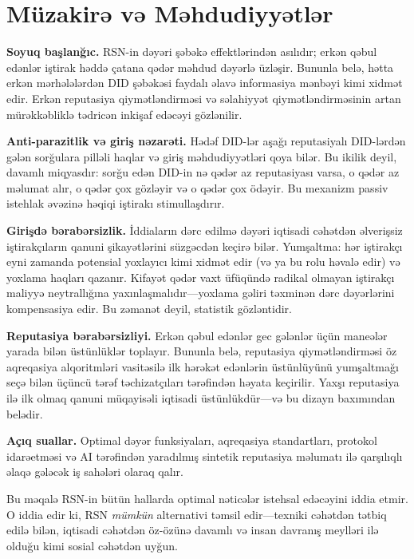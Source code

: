 \documentclass[11pt,a4paper,twocolumn]{article}
\begin{document}
\section{Müzakirə və Məhdudiyyətlər}

\textbf{Soyuq başlanğıc.} RSN-in dəyəri şəbəkə effektlərindən asılıdır; erkən qəbul edənlər iştirak həddə çatana qədər məhdud dəyərlə üzləşir. Bununla belə, hətta erkən mərhələlərdən DID şəbəkəsi faydalı əlavə informasiya mənbəyi kimi xidmət edir. Erkən reputasiya qiymətləndirməsi və səlahiyyət qiymətləndirməsinin artan mürəkkəbliklə tədricən inkişaf edəcəyi gözlənilir.

\textbf{Anti-parazitlik və giriş nəzarəti.} Hədəf DID-lər aşağı reputasiyalı DID-lərdən gələn sorğulara pilləli haqlar və giriş məhdudiyyətləri qoya bilər. Bu ikilik deyil, davamlı miqyasdır: sorğu edən DID-in nə qədər az reputasiyası varsa, o qədər az məlumat alır, o qədər çox gözləyir və o qədər çox ödəyir. Bu mexanizm passiv istehlak əvəzinə həqiqi iştirakı stimullaşdırır.

\textbf{Girişdə bərabərsizlik.} İddiaların dərc edilmə dəyəri iqtisadi cəhətdən əlverişsiz iştirakçıların qanuni şikayətlərini süzgəcdən keçirə bilər. Yumşaltma: hər iştirakçı eyni zamanda potensial yoxlayıcı kimi xidmət edir (və ya bu rolu həvalə edir) və yoxlama haqları qazanır. Kifayət qədər vaxt üfüqündə radikal olmayan iştirakçı maliyyə neytrallığına yaxınlaşmalıdır---yoxlama gəliri təxminən dərc dəyərlərini kompensasiya edir. Bu zəmanət deyil, statistik gözləntidir.

\textbf{Reputasiya bərabərsizliyi.} Erkən qəbul edənlər gec gələnlər üçün maneələr yarada bilən üstünlüklər toplayır. Bununla belə, reputasiya qiymətləndirməsi öz aqreqasiya alqoritmləri vasitəsilə ilk hərəkət edənlərin üstünlüyünü yumşaltmağı seçə bilən üçüncü tərəf təchizatçıları tərəfindən həyata keçirilir. Yaxşı reputasiya ilə ilk olmaq qanuni müqayisəli iqtisadi üstünlükdür---və bu dizayn baxımından belədir.

\textbf{Açıq suallar.} Optimal dəyər funksiyaları, aqreqasiya standartları, protokol idarəetməsi və AI tərəfindən yaradılmış sintetik reputasiya məlumatı ilə qarşılıqlı əlaqə gələcək iş sahələri olaraq qalır.

Bu məqalə RSN-in bütün hallarda optimal nəticələr istehsal edəcəyini iddia etmir. O iddia edir ki, RSN \emph{mümkün} alternativi təmsil edir---texniki cəhətdən tətbiq edilə bilən, iqtisadi cəhətdən öz-özünə davamlı və insan davranış meylləri ilə olduğu kimi sosial cəhətdən uyğun.
\end{document}
